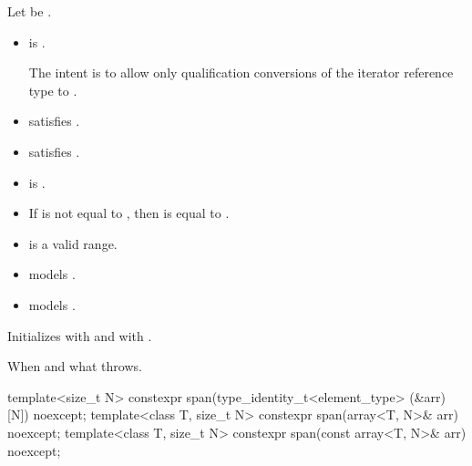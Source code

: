 \begin{itemdescr}
\pnum
\constraints
Let  be .
\begin{itemize}
\item
{} is .
\begin{note}
The intent is to allow only qualification conversions
of the iterator reference type to .
\end{note}
\item {} satisfies .
\item {} satisfies .
\item {} is .
\end{itemize}

\pnum
\expects
\begin{itemize}
\item
If  is not equal to ,
then  is equal to .
\item {} is a valid range.
\item {} models .
\item {} models .
\end{itemize}

\pnum
\effects
Initializes  with  and
 with .

\pnum
\throws
When and what  throws.
\end{itemdescr}

%
\begin{itemdecl}
template<size_t N> constexpr span(type_identity_t<element_type> (&arr)[N]) noexcept;
template<class T, size_t N> constexpr span(array<T, N>& arr) noexcept;
template<class T, size_t N> constexpr span(const array<T, N>& arr) noexcept;
\end{itemdecl}

